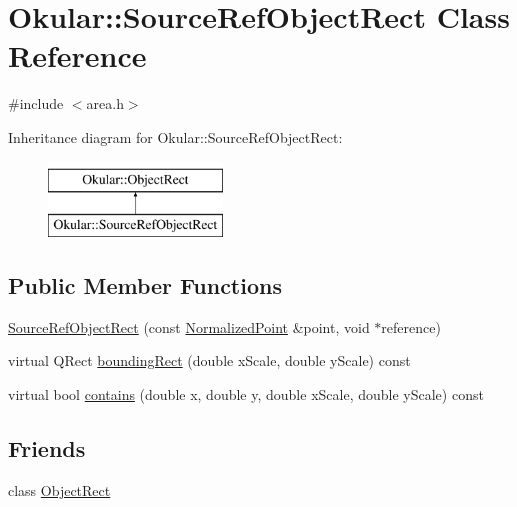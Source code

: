 \hypertarget{classOkular_1_1SourceRefObjectRect}{\section{Okular\+:\+:Source\+Ref\+Object\+Rect Class Reference}
\label{classOkular_1_1SourceRefObjectRect}
}


{\ttfamily \#include $<$area.\+h$>$}

Inheritance diagram for Okular\+:\+:Source\+Ref\+Object\+Rect\+:\begin{figure}[H]
\begin{center}
\leavevmode
\includegraphics[height=2.000000cm]{classOkular_1_1SourceRefObjectRect}
\end{center}
\end{figure}
\subsection*{Public Member Functions}
\begin{DoxyCompactItemize}
\item 
\hyperlink{classOkular_1_1SourceRefObjectRect_a354f74d01736e6d1aacd744e409872a3}{Source\+Ref\+Object\+Rect} (const \hyperlink{classOkular_1_1NormalizedPoint}{Normalized\+Point} \&point, void $\ast$reference)
\item 
virtual Q\+Rect \hyperlink{classOkular_1_1SourceRefObjectRect_a98e76ad83344b38637d27a80c2d18034}{bounding\+Rect} (double x\+Scale, double y\+Scale) const 
\item 
virtual bool \hyperlink{classOkular_1_1SourceRefObjectRect_a0e39f51ab84d5c36b2a16c30b2a33ff3}{contains} (double x, double y, double x\+Scale, double y\+Scale) const 
\end{DoxyCompactItemize}
\subsection*{Friends}
\begin{DoxyCompactItemize}
\item 
class \hyperlink{classOkular_1_1SourceRefObjectRect_ae6167dbefdc7f5fd8f1425f4d036da82}{Object\+Rect}
\end{DoxyCompactItemize}

